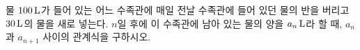 물 $100\mkern3mu \mathrm{L}$가 들어 있는 어느 수족관에 매일 전날 수족관에 들어 있던 물의 반을 버리고 $30\mkern3mu \mathrm{L}$의 물을 새로 넣는다. $n$일 후에 이 수족관에 남아 있는 물의 양을 $a_n\mkern3mu \mathrm{L}$라 할 때, $a_n$과 $a_{n+1}$ 사이의 관계식을 구하시오.

